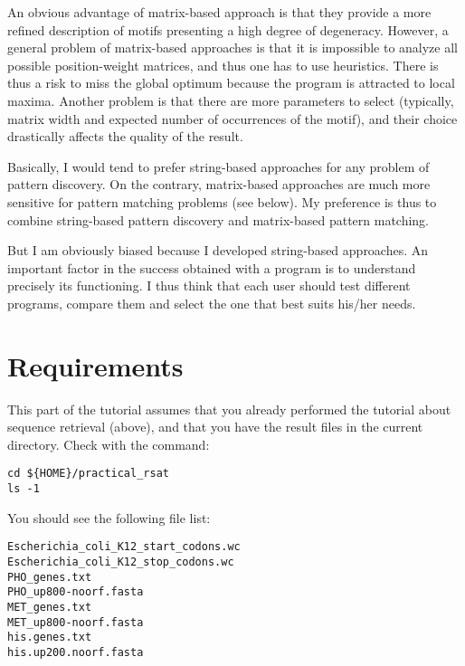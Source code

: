An obvious advantage of matrix-based approach is that they provide a
more refined description of motifs presenting a high degree of
degeneracy. However, a general problem of matrix-based approaches is
that it is impossible to analyze all possible position-weight
matrices, and thus one has to use heuristics. There is thus a risk to
miss the global optimum because the program is attracted to local
maxima. Another problem is that there are more parameters to select
(typically, matrix width and expected number of occurrences of the
motif), and their choice drastically affects the quality of the
result.

Basically, I would tend to prefer string-based approaches for any
problem of pattern discovery. On the contrary, matrix-based approaches
are much more sensitive for pattern matching problems (see below). My
preference is thus to combine string-based pattern discovery and
matrix-based pattern matching.

But I am obviously biased because I developed string-based
approaches. An important factor in the success obtained with a program
is to understand precisely its functioning. I thus think that each
user should test different programs, compare them and select the one
that best suits his/her needs.

\section{Requirements}

This part of the tutorial assumes that you already performed the
tutorial about sequence retrieval (above), and that you have the
result files in the current directory. Check with the command:

{\color{Blue} \begin{footnotesize} 
\begin{verbatim}
cd ${HOME}/practical_rsat
ls -1
\end{verbatim} \end{footnotesize}
}


You should see the following file list:
{\color{Blue} \begin{footnotesize} 
\begin{verbatim}
Escherichia_coli_K12_start_codons.wc
Escherichia_coli_K12_stop_codons.wc
PHO_genes.txt
PHO_up800-noorf.fasta
MET_genes.txt
MET_up800-noorf.fasta
his.genes.txt
his.up200.noorf.fasta
\end{verbatim} \end{footnotesize}
}


